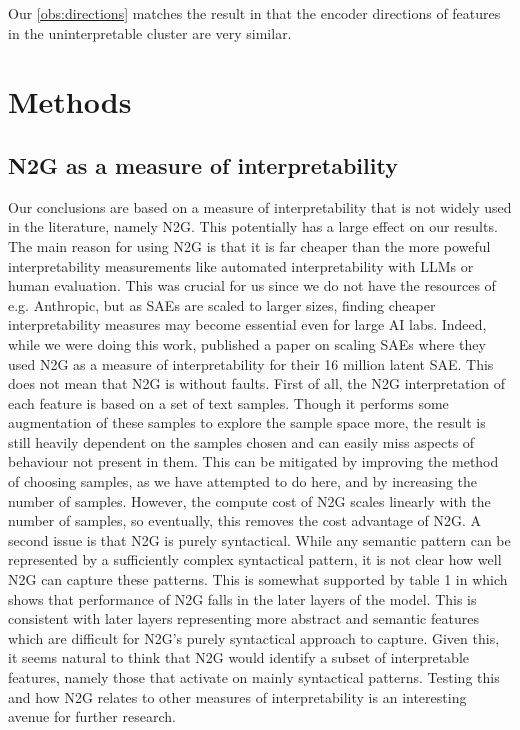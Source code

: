 Our \ref{obs:directions} matches the result in \textcite{nanda_open_2023} that the encoder directions of features in the uninterpretable cluster are very similar.


\section{Methods}
\subsection{N2G as a measure of interpretability}
\label{sec:n2g_interpretability}
Our conclusions are based on a measure of interpretability that is not widely used in the literature, namely N2G.
This potentially has a large effect on our results.
The main reason for using N2G is that it is far cheaper than the more poweful interpretability measurements like automated interpretability with LLMs or human evaluation.
This was crucial for us since we do not have the resources of e.g. Anthropic, but as SAEs are scaled to larger sizes, finding cheaper interpretability measures may become essential even for large AI labs.
Indeed, while we were doing this work, \textcite{gao_scaling_2024} published a paper on scaling SAEs where they used N2G as a measure of interpretability for their 16 million latent SAE.
This does not mean that N2G is without faults.
First of all, the N2G interpretation of each feature is based on a set of text samples.
Though it performs some augmentation of these samples to explore the sample space more, the result is still heavily dependent on the samples chosen and can easily miss aspects of behaviour not present in them.
This can be mitigated by improving the method of choosing samples, as we have attempted to do here, and by increasing the number of samples.
However, the compute cost of N2G scales linearly with the number of samples, so eventually, this removes the cost advantage of N2G.
A second issue is that N2G is purely syntactical.
While any semantic pattern can be represented by a sufficiently complex syntactical pattern, it is not clear how well N2G can capture these patterns.
This is somewhat supported by table 1 in \textcite{foote_neuron_2023} which shows that performance of N2G falls in the later layers of the model.
This is consistent with later layers representing more abstract and semantic features which are difficult for N2G's purely syntactical approach to capture.
Given this, it seems natural to think that N2G would identify a subset of interpretable features, namely those that activate on mainly syntactical patterns.
Testing this and how N2G relates to other measures of interpretability is an interesting avenue for further research.


